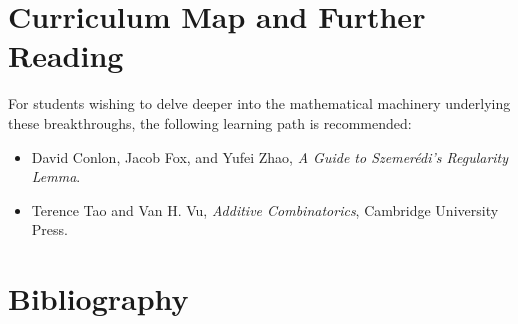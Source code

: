\section{Curriculum Map and Further Reading}
For students wishing to delve deeper into the mathematical machinery underlying these breakthroughs, the following learning path is recommended:
\begin{itemize}
  \item David Conlon, Jacob Fox, and Yufei Zhao, \emph{A Guide to Szemer\'edi's Regularity Lemma}.
  \item Terence Tao and Van H. Vu, \emph{Additive Combinatorics}, Cambridge University Press.
\end{itemize}

\section*{Bibliography}
